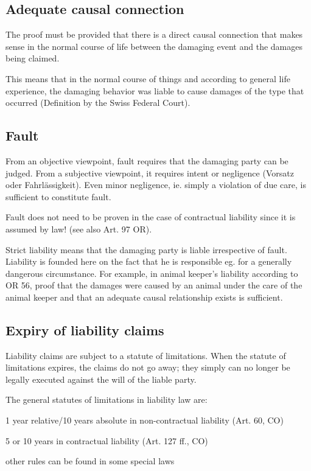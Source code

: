 \subsection{Adequate causal connection}
\begin{compactitem}
	\item The proof must be provided that there is a direct causal connection that makes sense in the normal course of life between the damaging event and the damages being claimed.
	\item This means that in the normal course of things and according to general life experience, the damaging	behavior was liable to cause damages of the type that occurred (Definition by the Swiss Federal Court).
\end{compactitem}

\subsection{Fault}
\begin{compactitem}
	\item From an objective viewpoint, fault requires that the damaging party can be judged. From a subjective viewpoint, it requires intent or negligence (Vorsatz oder Fahrlässigkeit). Even minor negligence, ie. simply a violation of due care, is sufficient to constitute fault.
	\item Fault does not need to be proven in the case of contractual liability since it is assumed by law! (see also Art. 97 OR).
	\item Strict liability means that the damaging party is liable irrespective of fault. Liability is founded here on the fact that he is responsible eg. for a generally dangerous circumstance. For example, in animal keeper's liability according to OR 56, proof that the damages were caused by an animal under the care of the animal keeper and that an adequate causal relationship exists is sufficient.
\end{compactitem}

\subsection{Expiry of liability claims}
\begin{compactitem}
	\item Liability claims are subject to a statute of limitations. When the statute of limitations expires, the claims do not go away; they simply can no longer be legally executed against the will of the liable party.
	\item The general statutes of limitations in liability law are:
	\begin{compactitem}
		\item 1 year relative/10 years absolute in non-contractual liability (Art. 60, CO)
		\item 5 or 10 years in contractual liability (Art. 127 ff., CO)
		\item other rules can be found in some special laws
	\end{compactitem}
\end{compactitem}

